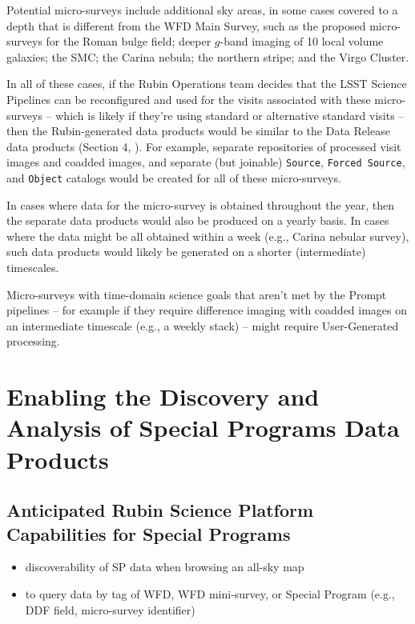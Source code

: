 \documentclass[DM,lsstdoc,toc]{lsstdoc}
\begin{document}
Potential micro-surveys include additional sky areas, in some cases covered to a depth that is different from the WFD Main Survey, such as the proposed micro-surveys for the Roman bulge field; deeper $g$-band imaging of 10 local volume galaxies; the SMC; the Carina nebula; the northern stripe; and the Virgo Cluster.

In all of these cases, if the Rubin Operations team decides that the LSST Science Pipelines can be reconfigured and used for the visits associated with these micro-surveys -- which is likely if they're using standard or alternative standard visits --  then the Rubin-generated data products would be similar to the Data Release data products (Section 4, ).
For example, separate repositories of processed visit images and coadded images, and separate (but joinable) {\tt Source}, {\tt Forced Source}, and {\tt Object} catalogs would be created for all of these micro-surveys.

In cases where data for the micro-survey is obtained throughout the year, then the separate data products would also be produced on a yearly basis.
In cases where the data might be all obtained within a week (e.g., Carina nebular survey), such data products would likely be generated on a shorter (intermediate) timescales. 

Micro-surveys with time-domain science goals that aren't met by the Prompt pipelines -- for example if they require difference imaging with coadded images on an intermediate timescale (e.g., a weekly stack) --  might require User-Generated processing.


\clearpage
\section{Enabling the Discovery and Analysis of Special Programs Data Products}\label{sec:analysis}

\subsection{Anticipated Rubin Science Platform Capabilities for Special Programs }

\begin{itemize}
\item discoverability of SP data when browsing an all-sky map
\item to query data by tag of WFD, WFD mini-survey, or Special Program (e.g., DDF field, micro-survey identifier)
\end{itemize}




\clearpage



\clearpage
\appendix










\end{document}
